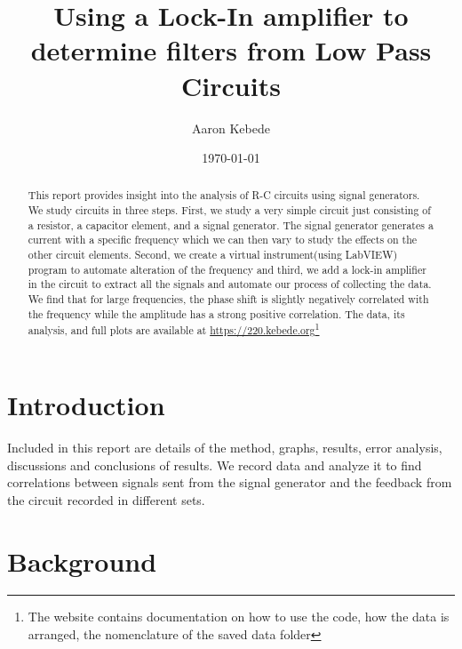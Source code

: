 \documentclass[twocolumn]{article}\usepackage[english]{babel}
\title{Using a Lock-In amplifier to determine filters from Low Pass Circuits}
\author{Aaron Kebede}
\date{\today}
\begin{document}
\maketitle
\begin{abstract}

This report provides insight into the analysis of R-C circuits using signal generators. We study circuits in three steps. First, we study a very simple circuit just consisting of a resistor, a capacitor element, and a signal generator. The signal generator generates a current with a specific frequency which we can then vary to study the effects on the other circuit elements. Second, we create a virtual instrument(using LabVIEW) program to automate alteration of the frequency and third, we add a lock-in amplifier in the circuit to extract all the signals and automate our process of collecting the data. We find that for large frequencies, the phase shift is slightly negatively correlated with the frequency while the amplitude has a strong positive correlation. The data, its analysis, and full plots are available at \url{https://220.kebede.org}\footnote{The website contains documentation on how to use the code, how the data is arranged, the nomenclature of the saved data folder}

\end{abstract}

\section{Introduction}

Included in this report are details of the method, graphs, results, error analysis, discussions and conclusions of results. We record data and analyze it to find correlations between signals sent from the signal generator and the feedback from the circuit recorded in different sets.  
\newline

\section{Background}
\end{document}
